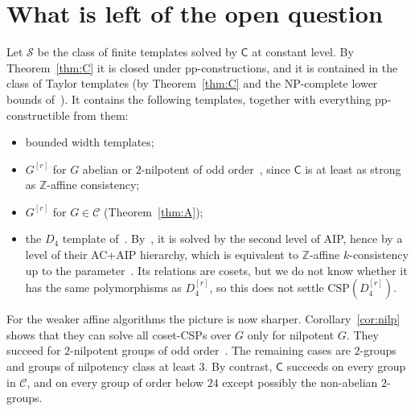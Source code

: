 \documentclass[11pt]{article}
\theoremstyle{definition}
\theoremstyle{remark}
\newcommand{\Csp}{\mathrm{CSP}}
\newcommand{\Coh}{\mathsf{C}}
\newcommand{\Z}{\mathbb Z}
\begin{document}
\section{What is left of the open question}\label{sec:discussion}

Let $\mathcal S$ be the class of finite templates solved by $\Coh$ at constant
level. By Theorem~\ref{thm:C} it is closed under pp-constructions, and it is
contained in the class of Taylor templates (by Theorem~\ref{thm:C} and the
NP-complete lower bounds of~\cite{LP25,CGP26}).
It contains the following templates, together with everything pp-constructible
from them:
\begin{itemize}
\item bounded width templates;
\item $G^{[r]}$ for $G$ abelian or $2$-nilpotent of odd order~\cite{LP25},
since $\Coh$ is at least as strong as $\Z$-affine consistency;
\item $G^{[r]}$ for $G\in\mathcal C$ (Theorem~\ref{thm:A});
\item the $D_4$ template of~\cite{Zhu25}. By~\cite{BHZ26}, it is solved by
the second level of AIP, hence by a level of their AC+AIP hierarchy, which is
equivalent to $\Z$-affine $k$-consistency up to the
parameter~\cite[Thm.~6.7]{BHZ26}. Its relations are cosets, but we do not know
whether it has the same polymorphisms as $D_4^{[r]}$, so this does not settle
$\Csp(D_4^{[r]})$.
\end{itemize}

For the weaker affine algorithms the picture is now sharper.
Corollary~\ref{cor:nilp} shows that they can solve all coset-CSPs over $G$ only for
nilpotent $G$. They succeed for $2$-nilpotent groups of odd order~\cite{LP25}. The
remaining cases are $2$-groups and groups of nilpotency class at least $3$. By
contrast, $\Coh$ succeeds on every group in $\mathcal C$, and on every group of order
below $24$ except possibly the non-abelian $2$-groups.
\end{document}
